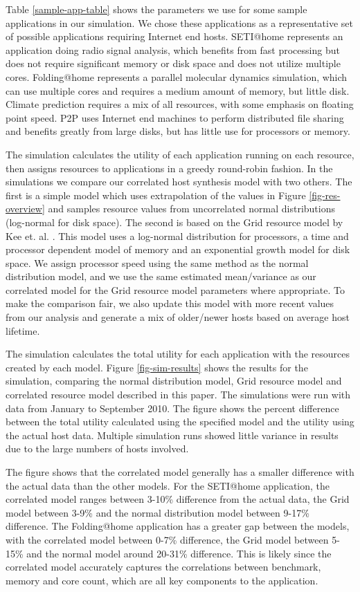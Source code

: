 \documentclass[conference]{IEEEtran}
\begin{document}
Table \ref{sample-app-table} shows the parameters we use for some sample applications in our simulation.  We chose these applications as a representative set of possible applications requiring Internet end hosts.  SETI@home represents an application doing radio signal analysis, which benefits from fast processing but does not require significant memory or disk space and does not utilize multiple cores.  Folding@home represents a parallel molecular dynamics simulation, which can use multiple cores and requires a medium amount of memory, but little disk.  Climate prediction requires a mix of all resources, with some emphasis on floating point speed.  P2P uses Internet end machines to perform distributed file sharing and benefits greatly from large disks, but has little use for processors or memory.

The simulation calculates the utility of each application running on each resource, then assigns resources to applications in a greedy round-robin fashion.  In the simulations we compare our correlated host synthesis model with two others.  The first is a simple model which uses extrapolation of the values in Figure \ref{fig-res-overview} and samples resource values from uncorrelated normal distributions (log-normal for disk space).  The second is based on the Grid resource model by Kee et. al. \cite{Kee:2004p763}.  This model uses a log-normal distribution for processors, a time and processor dependent model of memory and an exponential growth model for disk space.  We assign processor speed using the same method as the normal distribution model, and we use the same estimated mean/variance as our correlated model for the Grid resource model parameters where appropriate.  To make the comparison fair, we also update this model with more recent values from our analysis and generate a mix of older/newer hosts based on average host lifetime.

The simulation calculates the total utility for each application with the resources created by each model.  Figure \ref{fig-sim-results} shows the results for the simulation, comparing the normal distribution model, Grid resource model and correlated resource model described in this paper.  The simulations were run with data from January to September 2010.  The figure shows the percent difference between the total utility calculated using the specified model and the utility using the actual host data.  Multiple simulation runs showed little variance in results due to the large numbers of hosts involved.

The figure shows that the correlated model generally has a smaller difference with the actual data than the other models.  For the SETI@home application, the correlated model ranges between 3-10\% difference from the actual data, the Grid model between 3-9\% and the normal distribution model between 9-17\% difference.  The Folding@home application has a greater gap between the models, with the correlated model between 0-7\% difference, the Grid model between 5-15\% and the normal model around 20-31\% difference.  This is likely since the correlated model accurately captures the correlations between benchmark, memory and core count, which are all key components to the application.
\end{document}

